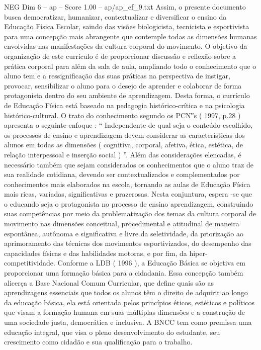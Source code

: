\begin{textsample}{NEG Dim 6 – ap – Score 1.00 – ap/ap\_ef\_9.txt}
Assim, o presente documento busca democratizar, humanizar, contextualizar e diversificar o ensino da Educação Física Escolar, saindo das visões biologicista, tecnicista e esportivista para uma concepção mais abrangente que contemple todas as dimensões humanas envolvidas nas manifestações da cultura corporal do movimento.
O objetivo da organização de este currículo é de proporcionar discussão e reflexão sobre a prática corporal para além da sala de aula, ampliando todo o conhecimento que o aluno tem e a ressignificação das suas práticas na perspectiva de instigar, provocar, sensibilizar o aluno para o desejo de aprender e colaborar de forma protagonista dentro do seu ambiente de aprendizagem.
Desta forma, o currículo de Educação Física está baseado na pedagogia histórico-crítica e na psicologia histórico-cultural.
O trato do conhecimento segundo os PCN‟s ( 1997, p.28 ) apresenta o seguinte enfoque : “ Independente de qual seja o conteúdo escolhido, os processos de ensino e aprendizagem devem considerar as características dos alunos em todas as dimensões ( cognitiva, corporal, afetiva, ética, estética, de relação interpessoal e inserção social ) ”.
Além das considerações elencadas, é necessário também que sejam considerados os conhecimentos que o aluno traz de sua realidade cotidiana, devendo ser contextualizados e complementados por conhecimentos mais elaborados na escola, tornando as aulas de Educação Física mais ricas, variadas, significativas e prazerosas.
Nesta conjuntura, espera -se que o educando seja o protagonista no processo de ensino aprendizagem, construindo suas competências por meio da problematização dos temas da cultura corporal de movimento nas dimensões conceitual, procedimental e atitudinal de maneira espontânea, autônoma e significativa e livre da seletividade, da priorização ao aprimoramento das técnicas dos movimentos esportivizados, do desempenho das capacidades físicas e das habilidades motoras, e por fim, da hiper-competitividade.
Conforme a LDB ( 1996 ), a Educação Básica se objetiva em proporcionar uma formação básica para a cidadania.
Essa concepção também alicerça a Base Nacional Comum Curricular, que define quais são as aprendizagens essenciais que todos os alunos têm o direito de adquirir ao longo da educação básica, ela está orientada pelos princípios éticos, estéticos e políticos que visam a formação humana em suas múltiplas dimensões e a construção de uma sociedade justa, democrática e inclusiva.
A BNCC tem como premissa uma educação integral, que visa o pleno desenvolvimento do estudante, seu crescimento como cidadão e sua qualificação para o trabalho.

\end{textsample}
